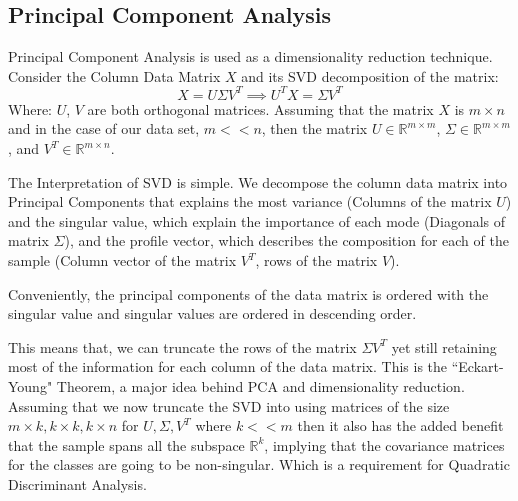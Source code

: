 \documentclass{article}
\begin{document}
    \subsection{Principal Component Analysis}
        \hspace{1.1em}
        Principal Component Analysis is used as a dimensionality reduction technique. Consider the Column Data Matrix $X$ and its SVD decomposition of the matrix: 
        \begin{equation*}\tag{6}\label{eqn:6}
            X = U\Sigma V^T \implies U^TX = \Sigma V^T
        \end{equation*}
        Where: $U$, $V$ are both orthogonal matrices. Assuming that the matrix $X$ is $m\times n$ and in the case of our data set, $m << n$, then the matrix $U\in \mathbb{R}^{m\times m}$, $\Sigma \in\mathbb{R}^{m\times m}$, and $V^T\in\mathbb{R}^{m\times n}$. 
        \par
        The Interpretation of SVD is simple. We decompose the column data matrix into Principal Components that explains the most variance (Columns of the matrix $U$) and the singular value, which explain the importance of each mode (Diagonals of matrix $\Sigma$), and the profile vector, which describes the composition for each of the sample (Column vector of the matrix $V^T$, rows of the matrix $V$). 
        \par
        Conveniently, the principal components of the data matrix is ordered with the singular value and singular values are ordered in descending order. 
        \par
        This means that, we can truncate the rows of the matrix $\Sigma V^T$ yet still retaining most of the information for each column of the data matrix. This is the ``Eckart-Young" Theorem, a major idea behind PCA and dimensionality reduction. Assuming that we now truncate the SVD into using matrices of the size $m \times k, k\times k, k\times n$ for $U, \Sigma, V^T$ where $k << m$ then it also has the added benefit that the sample spans all the subspace $\mathbb{R}^k$, implying that the covariance matrices for the classes are going to be non-singular. Which is a requirement for Quadratic Discriminant Analysis. 
        
\end{document}
